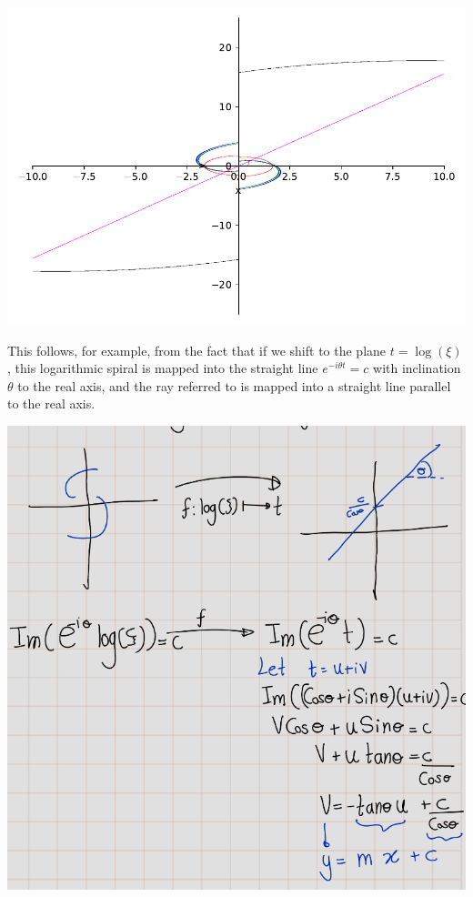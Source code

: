 \documentclass[
]{book}
\theoremstyle{definition}
\theoremstyle{definition}
\theoremstyle{definition}
\theoremstyle{definition}
\theoremstyle{remark}
\begin{document}
\includegraphics{ConformalMapping_files/figure-latex/unnamed-chunk-64-17.pdf}

This follows, for example, from the fact that if we shift to the plane \(t = \log(\xi)\), this logarithmic spiral is mapped into the straight line \(e^{-i\theta t} = c\) with inclination \(\theta\) to the real axis, and the ray referred to is mapped into a straight line parallel to the real axis.

\includegraphics[width=10.1in]{figures/Helical_Domain/fig1}
\end{document}
